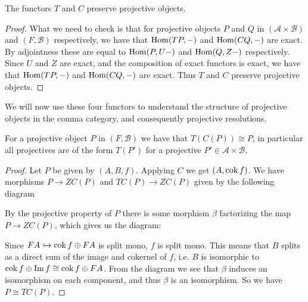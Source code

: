 \begin{cor}
	The functors $T$ and $C$ preserve projective objects.
	\begin{proof}
		What we need to check is that for projective objects $P$ and $Q$ in $(\mathcal A \times \mathcal B)$ and $(F, \mathcal B)$ respectively, we have that $\operatorname{Hom}(TP, -)$ and $\operatorname{Hom}(CQ, -)$ are exact. By adjointness these are equal to $\operatorname{Hom}(P, U-)$ and $\operatorname{Hom}(Q, Z-)$ respectively. Since $U$ and $Z$ are exact, and the composition of exact functors is exact, we have that $\operatorname{Hom}(TP, -)$ and $\operatorname{Hom}(CQ, -)$ are exact. Thus $T$ and $C$ preserve projective objects.
	\end{proof}
\end{cor}

We will now use these four functors to understand the structure of projective objects in the comma category, and consequently projective resolutions.

\begin{prop}\cite[Corollary~1.6c]{FGR75}
	For a projective object $P$ in $(F, \mathcal B)$ we have that $T(C(P)) \cong P$, in particular all projectives are of the form $T(P')$ for a projective $P' \in \mathcal A \times \mathcal B$.
	\begin{proof}
		Let $P$ be given by $(A,B,f)$. Applying $C$ we get $(A, \operatorname{cok} f)$. We have morphisms $P \to ZC(P)$ and $TC(P) \to ZC(P)$ given by the following diagram
		\begin{center}
		\end{center}
		By the projective property of $P$ there is some morphism $\beta$ factorizing the map $P \to ZC(P)$, which gives us the diagram:
		\begin{center}
		\end{center}
		Since $FA \hookrightarrow \operatorname{cok} f \oplus FA$ is split mono, $f$ is split mono. This means that $B$ splits as a direct sum of the image and cokernel of $f$, i.e. $B$ is isomorphic to $\operatorname{cok} f \oplus \operatorname{Im} f \cong \operatorname{cok} f \oplus FA$. From the diagram we see that $\beta$ induces an isomorphism on each component, and thus $\beta$ is an isomorphism. So we have $P \cong TC(P)$.
	\end{proof}
\end{prop}

